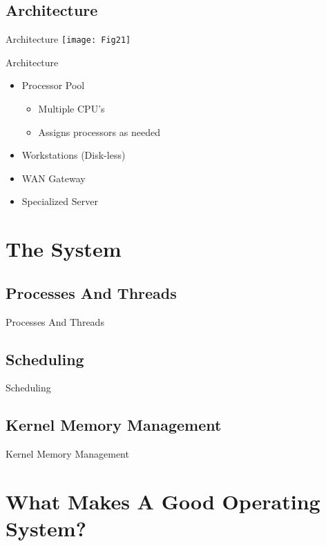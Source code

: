 \documentclass{beamer}
\begin{document}
\subsection{Architecture}

\begin{frame}{Architecture}
\texttt{[image: Fig21]}
\end{frame}

\begin{frame}{Architecture}
	\begin{itemize}
	\item Processor Pool
		\begin{itemize}
		\item Multiple CPU's
		\item Assigns processors as needed 
		\end{itemize}
	\item Workstations (Disk-less)
	\item WAN Gateway
	\item Specialized Server
	\end{itemize}

\end{frame}

\section{The System}

\subsection{Processes And Threads}

\begin{frame}{Processes And Threads}
\end{frame}

\subsection{Scheduling}
\begin{frame}{Scheduling}
\end{frame}

\subsection{Kernel Memory Management}
\begin{frame}{Kernel Memory Management}
\end{frame}

\section{What Makes A Good Operating System?}
\end{document}
